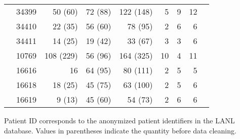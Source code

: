 \documentclass[12pt]{article}
\begin{document}
\begin{table*}
\begin{center}
\begin{tabular}{llrrrrrrr}
& 34399 & 50 (60) & 72 (88) & 122 (148) & 5 & 9 & 12 \\
& 34410 & 22 (35) & 56 (60) & 78 (95) & 2 & 6 & 6 \\
& 34411 & 14 (25) & 19 (42) & 33 (67) & 3 & 3 & 6 \\
\cite{Fischer04} & 10769 & 108 (229) & 56 (96) & 164 (325) & 10 & 4 & 11 \\ 
\cite{Llewellyn06} & 16616 & 16 & 64 (95) & 80 (111) & 2 & 5 & 5 \\
& 16618 & 18 (25) & 45 (75) & 63 (100) & 2 & 5 & 6 \\
& 16619 & 9 (13) & 45 (60) & 54 (73) & 2 & 6 & 6 \\
\hline
\end{tabular}
\end{center}
	Patient ID corresponds to the anonymized patient identifiers in the LANL database.
	Values in parentheses indicate the quantity before data cleaning.
\end{table*}

\pagebreak{}
\end{document}
